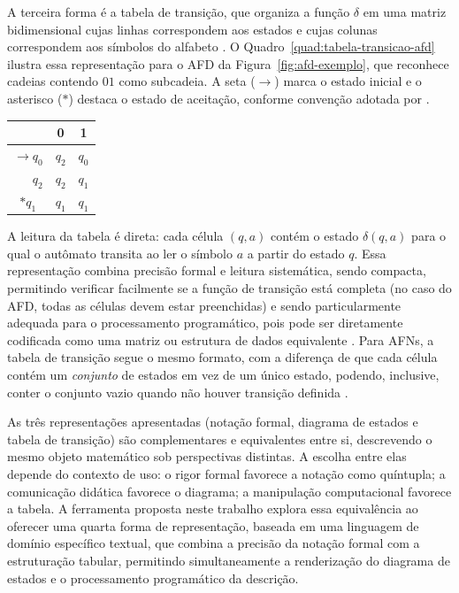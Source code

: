 \documentclass[
    12pt
    ,oneside
    ,a4paper
    ,chapter=TITLE
    ,section=TITLE
    ,sumario=abnt-6027-2012]{abntex2}
\begin{document}
A terceira forma é a tabela de transição, que organiza a função $\delta$ em uma matriz
bidimensional cujas linhas correspondem aos estados e cujas colunas correspondem aos símbolos do
alfabeto \cite{hopcroft2006}. O Quadro~\ref{quad:tabela-transicao-afd} ilustra essa representação
para o AFD da Figura~\ref{fig:afd-exemplo}, que reconhece cadeias contendo $01$ como subcadeia.
A seta ($\rightarrow$) marca o estado inicial e o asterisco ($*$) destaca o estado de
aceitação, conforme convenção adotada por .

\begin{quadro}[h]
    \centering
    \caption{TABELA DE TRANSIÇÃO DO AFD QUE RECONHECE CADEIAS CONTENDO 01}
    \label{quad:tabela-transicao-afd}
    \small
    
    \begin{tabular}{|c|c|c|}
        \hline
                                    & \textbf{0} & \textbf{1} \\
        \hline
        $\rightarrow q_0$           & $q_2$      & $q_0$      \\
        \hline
        $\phantom{\rightarrow} q_2$ & $q_2$      & $q_1$      \\
        \hline
        $* q_1$                     & $q_1$      & $q_1$      \\
        \hline
    \end{tabular}
\end{quadro}

A leitura da tabela é direta: cada célula $(q, a)$ contém o estado $\delta(q, a)$ para o qual o
autômato transita ao ler o símbolo $a$ a partir do estado $q$. Essa representação combina
precisão formal e leitura sistemática, sendo compacta, permitindo verificar facilmente se a
função de transição está completa (no caso do AFD, todas as células devem estar preenchidas) e
sendo particularmente adequada para o processamento programático, pois pode ser diretamente
codificada como uma matriz ou estrutura de dados equivalente \cite{hopcroft2006,sipser2012}.
Para AFNs, a tabela de transição segue o mesmo formato, com a diferença de que cada célula
contém um \textit{conjunto} de estados em vez de um único estado, podendo, inclusive, conter o
conjunto vazio quando não houver transição definida \cite{hopcroft2006}.

As três representações apresentadas (notação formal, diagrama de estados e tabela de transição)
são complementares e equivalentes entre si, descrevendo o mesmo objeto matemático sob
perspectivas distintas. A escolha entre elas depende do contexto de uso: o rigor formal favorece
a notação como quíntupla; a comunicação didática favorece o diagrama; a manipulação computacional
favorece a tabela. A ferramenta proposta neste trabalho explora essa equivalência ao oferecer
uma quarta forma de representação, baseada em uma linguagem de domínio específico textual, que
combina a precisão da notação formal com a estruturação tabular, permitindo simultaneamente a
renderização do diagrama de estados e o processamento programático da descrição.
\end{document}

